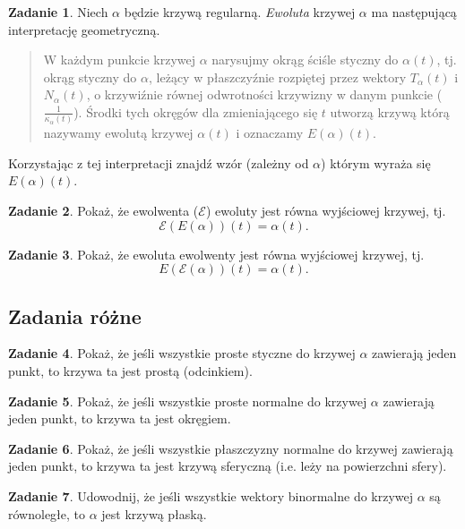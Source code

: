 \documentclass[a4paper,11pt]{article}
\theoremstyle{definition}\newtheorem{exercise}{Zadanie}
\theoremstyle{definition}\newtheorem{remark}{Uwaga}
\begin{document}
\begin{exercise}
Niech $\alpha$ będzie krzywą regularną. \textit{Ewoluta} krzywej $\alpha$ ma 
następującą interpretację geometryczną.

\begin{quote}
W każdym punkcie krzywej $\alpha$ narysujmy okrąg ściśle styczny do 
$\alpha(t)$, tj. okrąg styczny do $\alpha$, leżący w płaszczyźnie rozpiętej 
przez wektory $T_\alpha(t)$ i $N_\alpha(t)$, o krzywiźnie 
r\'ownej odwrotności krzywizny w danym punkcie ($\frac{1}{\kappa_{\alpha} 
(t)}$). Środki tych okręg\'ow dla zmieniającego się $t$ utworzą krzywą
kt\'orą nazywamy ewolutą krzywej $\alpha(t)$ i oznaczamy $E(\alpha)(t)$.
\end{quote}

Korzystając z tej interpretacji znajdź wz\'or (zależny od $\alpha$) kt\'orym 
wyraża się $E(\alpha)(t)$.
\end{exercise}


\begin{exercise}
Pokaż, że ewolwenta ($\mathcal{E}$) ewoluty jest równa wyjściowej krzywej, tj.
\[\mathcal{E}(E(\alpha))(t)=\alpha(t).\] 
\end{exercise}

\begin{exercise}
Pokaż, że ewoluta ewolwenty jest równa wyjściowej krzywej, tj.
\[E(\mathcal{E}(\alpha))(t)=\alpha(t).\] 
\end{exercise}

\subsection{Zadania r\'ożne}

\begin{exercise}
Pokaż, że jeśli wszystkie proste styczne do krzywej $\alpha$ zawierają jeden 
punkt, to krzywa ta jest prostą (odcinkiem).
\end{exercise}

\begin{exercise}
Pokaż, że jeśli wszystkie proste normalne do krzywej $\alpha$ zawierają jeden 
punkt, to krzywa ta jest okręgiem.
\end{exercise}

\begin{exercise}
 Pokaż, że jeśli wszystkie płaszczyzny normalne do krzywej zawierają jeden 
punkt, to krzywa ta jest krzywą sferyczną (i.e. leży na powierzchni sfery).
\end{exercise}

\begin{exercise}
Udowodnij, że jeśli wszystkie wektory binormalne do krzywej $\alpha$ są 
równoległe, to $\alpha$ jest krzywą płaską.
\end{exercise}
\end{document}
